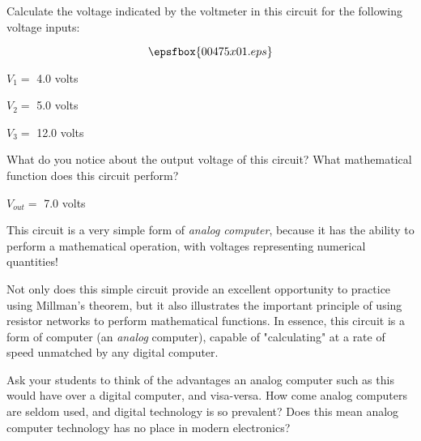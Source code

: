 

Calculate the voltage indicated by the voltmeter in this circuit for the following voltage inputs:

$$\epsfbox{00475x01.eps}$$

\medskip
\item{} $V_1 =$ 4.0 volts
\item{} $V_2 =$ 5.0 volts
\item{} $V_3 =$ 12.0 volts
\medskip

What do you notice about the output voltage of this circuit?  What mathematical function does this circuit perform?







$V_{out} =$ 7.0 volts

\vskip 5pt

This circuit is a very simple form of {\it analog computer}, because it has the ability to perform a mathematical operation, with voltages representing numerical quantities!







Not only does this simple circuit provide an excellent opportunity to practice using Millman's theorem, but it also illustrates the important principle of using resistor networks to perform mathematical functions.  In essence, this circuit is a form of computer (an {\it analog} computer), capable of "calculating" at a rate of speed unmatched by any digital computer.

Ask your students to think of the advantages an analog computer such as this would have over a digital computer, and visa-versa.  How come analog computers are seldom used, and digital technology is so prevalent?  Does this mean analog computer technology has no place in modern electronics?




